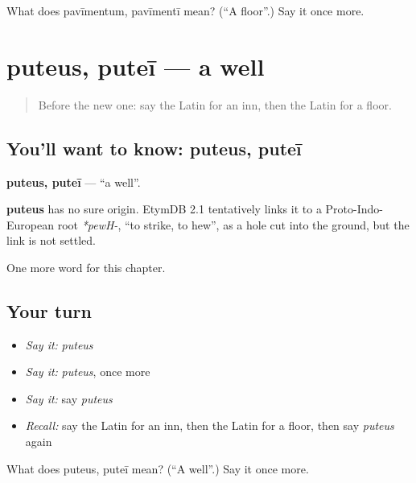 \begin{tcolorbox}[breakable,colback=teal!4,colframe=teal!35!black,title={Before you move on}]
What does pavīmentum, pavīmentī mean? (\textquotedblleft{}A floor\textquotedblright{}.) Say it once more.
\end{tcolorbox}
\section[puteus, puteī]{puteus, puteī — a well}

\label{lesson:LA-C118-puteus}



\begin{quote}
Before the new one: say the Latin for an inn, then the Latin for a floor.
\end{quote}

\subsection*{You'll want to know: puteus, puteī}
\textbf{puteus, puteī} — \textquotedblleft{}a well\textquotedblright{}.

\begin{cousinweb}
\textbf{puteus} has no sure origin. EtymDB 2.1 tentatively links it to a Proto-Indo-European root \emph{*pewH-}, \textquotedblleft{}to strike, to hew\textquotedblright{}, as a hole cut into the ground, but the link is not settled.
\end{cousinweb}

\begin{grammarlens}[title={What you've built}]
One more word for this chapter.
\end{grammarlens}

\subsection*{Your turn}
\begin{itemize}
\raggedright
  \item \emph{Say it:} \emph{puteus}
  \item \emph{Say it:} \emph{puteus}, once more
  \item \emph{Say it:} say \emph{puteus}
  \item \emph{Recall:} say the Latin for an inn, then the Latin for a floor, then say \emph{puteus} again
\end{itemize}

\begin{tcolorbox}[breakable,colback=teal!4,colframe=teal!35!black,title={Before you move on}]
What does puteus, puteī mean? (\textquotedblleft{}A well\textquotedblright{}.) Say it once more.
\end{tcolorbox}
